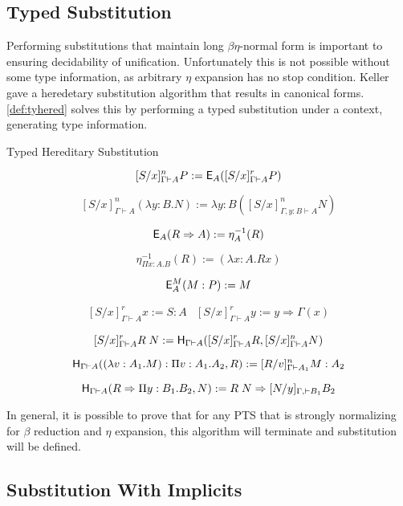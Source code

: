 \subsection{Typed Substitution}

Performing substitutions that maintain long $\beta\eta$-normal 
form is important to ensuring decidability of unification.  
Unfortunately this is not possible without some type information, 
as arbitrary $\eta$ expansion has no stop condition. 
Keller \citep{keller2010normalization} gave a heredetary substitution algorithm
that results in canonical forms. \ref{def:tyhered} solves this by performing
a typed substitution under a context, generating type information.

\begin{definition}
Typed Hereditary Substitution

\[
[S / x]^n_{\Gamma \vdash A} P := \mathsf{E}_A([S / x]^r_{\Gamma \vdash A} P)
\]

\[
[S / x]^n_{\Gamma \vdash A} (\lambda y : B . N) := \lambda y:B ([S / x ]^n_{\Gamma, y: B \vdash A} N)
\]

\[
\mathsf{E}_A(R \Rightarrow A) := \eta^{-1}_A (R)
\]

\[
\eta^{-1}_{\Pi x : A . B}(R) := (\lambda x : A . R x)
\]

\[
\mathsf{E}^M_A(M : P) := M
\]

\[ \begin{array}{lr}
[ S / x ]^r_{\Gamma \vdash A} x := S : A
&
[S / x]^r_{\Gamma \vdash A} y := y \Rightarrow \Gamma(x)
\end{array} \] 

\[
[S / x]^r_{\Gamma \vdash A} R\;N := 
\mathsf{H}_{\Gamma \vdash A} ([S/x]^r_{\Gamma \vdash A} R, [S/x]^n_{\Gamma \vdash A} N) 
\]

\[
\mathsf{H}_{\Gamma \vdash A} ((\lambda v : A_1 . M) : \Pi v : A_1 . A_2 , R) 
:= 
[R/v]^n_{\Gamma \vdash A_1} M : A_2
\]

\[
\mathsf{H}_{\Gamma \vdash A}(R \Rightarrow \Pi y : B_1 . B_2 , N) 
:= 
R\; N \Rightarrow [N/y]_{\Gamma,\vdash B_1}B_2
\]

\label{def:tyhered}
\end{definition}

In general, it is possible to prove that for any PTS that is strongly normalizing for $\beta$ reduction and 
$\eta$ expansion, this algorithm will terminate and substitution will be defined. 

\subsection{Substitution With Implicits}

